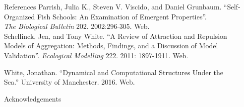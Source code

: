 \documentclass[final, xcolor=dvipsnames]{beamer}
\newlength{\onecolwid}
\begin{document}
\begin{frame}[t]
\begin{columns}[t]
\begin{column}{\onecolwid}
\begin{block}{References}
{	\noindent Parrish, Julia K., Steven V. Viscido, and Daniel Grunbaum. ``Self-\\
	\hspace{0.5cm} Organized Fish Schools: An Examination of Emergent Properties''. \\  
	\hspace{0.5cm} \textit{The Biological Bulletin} 202. 2002:296-305. Web. \\
	
	\noindent Schellinck, Jen, and Tony White. ``A Review of Attraction and Repulsion\\
	\hspace{0.5cm} Models of Aggregation: Methods, Findings, and a Discussion of Model \\
	\hspace{0.5cm} Validation''. \textit{Ecological Modelling} 222. 2011: 1897-1911. Web.}
	
	\noindent White, Jonathan.  ``Dynamical and Computational Structures Under the\\
	\hspace{0.5cm} Sea.'' University of Manchester. 2016. Web.

\end{block}



\begin{block}{Acknowledgements}

\small{} \\

\end{block}




\end{column}
\end{columns}
\end{frame}
\end{document}
